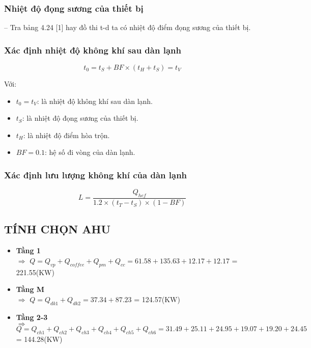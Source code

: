 \subsubsection{Nhiệt độ đọng sương của thiết bị}
-- Tra bảng 4.24 [1] hay đồ thi t-d ta có nhiệt độ điểm đọng sương của thiết bị.
\subsubsection{Xác định nhiệt độ không khí sau dàn lạnh}
\begin{equation*}
	t_{0} = t_{S} + BF\times (t_{H} + t_{S}) = t_{V}
\end{equation*}

Với:
\begin{itemize}
	\item $t_{0} = t_{V}$: là nhiệt độ không khí sau dàn lạnh.
	\item $t_{S}$: là nhiệt độ đọng sương của thiết bị.
	\item $t_{H}$:  là nhiệt độ điểm hòa trộn.
	\item $BF = 0.1$: hệ số đi vòng của dàn lạnh.
\end{itemize}
\subsubsection{Xác định lưu lượng không khí của dàn lạnh}
\begin{equation*}
	L = \dfrac{Q_{hef}}{1.2\times (t_{T} - t_{S})\times (1-BF)}
\end{equation*}

\subsection{TÍNH CHỌN AHU}
\begin{itemize}
	\item \textbf{Tầng 1}\\
	 $\Rightarrow$ $Q = Q_{vp} + Q_{coffee} + Q_{pm} + Q_{cc} = 61.58 + 135.63 + 12.17 + 12.17$ = 221.55(KW)
	 
	 \item \textbf{Tầng M}\\
	 $\Rightarrow$ $Q = Q_{dk1} + Q_{dk2} = 37.34 + 87.23$ = 124.57(KW)
	 
	 \item \textbf{Tầng 2-3}\\
	 $\Rightarrow$ $Q = Q_{ch1} + Q_{ch2} + Q_{ch3} + Q_{ch4} + Q_{ch5} + Q_{ch6} = 31.49 + 25.11 + 24.95 + 19.07 + 19.20 + 24.45$ = 144.28(KW)
\end{itemize}

